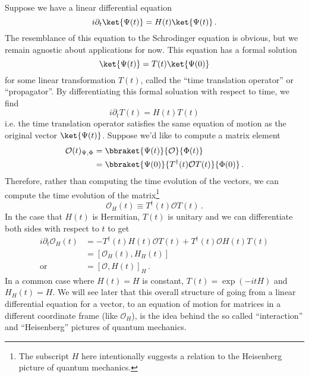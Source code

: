 Suppose we have a linear differential equation
\begin{equation}
  i \partial_t \ket{\Psi(t)} = H(t) \ket{\Psi(t)} \, .
\end{equation}
The resemblance of this equation to the Schrodinger equation is obvious, but we remain agnostic about applications for now.
This equation has a formal solution
\begin{equation}
  \ket{\Psi(t)} = T(t) \ket{\Psi(0)}
\end{equation}
for some linear transformation $T(t)$, called the ``time translation operator'' or ``propagator''.
By differentiating this formal soluation with respect to time, we find
\begin{equation}
  i \partial_t T(t) = H(t) T(t)
\end{equation}
i.e. the time translation operator satisfies the same equation of motion as the original vector $\ket{\Psi(t)}$.
Suppose we'd like to compute a matrix element
\begin{align}
  \mathcal{O}(t)_{\Psi,\Phi}
  &= \bbraket{\Psi(t)}{\mathcal{O}}{\Phi(t)} \nonumber \\
  &= \bbraket{\Psi(0)}{T^\dagger(t) \mathcal{O}T(t)}{\Phi(0)}
  \, .
\end{align}
Therefore, rather than computing the time evolution of the vectors, we can compute the time evolution of the matrix\footnote{The subscript $H$ here intentionally suggests a relation to the Heisenberg picture of quantum mechanics.}
\begin{equation}
  \mathcal{O}_H(t) \equiv T^\dagger(t) \mathcal{O} T(t)
  \, .
\end{equation}
In the case that $H(t)$ is Hermitian, $T(t)$ is unitary and we can differentiate both sides with respect to $t$ to get
\begin{align}
  i \partial_t \mathcal{O}_H(t)
  &= -T^\dagger(t) H(t) \mathcal{O} T(t)
     + T^\dagger(t) \mathcal{O} H(t) T(t) \nonumber \\
  &= \left[ \mathcal{O}_H(t), H_H(t) \right] \\
  \text{or} \qquad
  &= \left[ \mathcal{O}, H(t) \right]_H
  \, .
\end{align}
In a common case where $H(t) = H$ is constant, $T(t) = \exp(-i t H)$ and $H_H(t) = H$.
We will see later that this overall structure of going from a linear differential equation for a vector, to an equation of motion for matrices in a different coordinate frame (like $\mathcal{O}_H$), is the idea behind the so called ``interaction'' and ``Heisenberg'' pictures of quantum mechanics.


